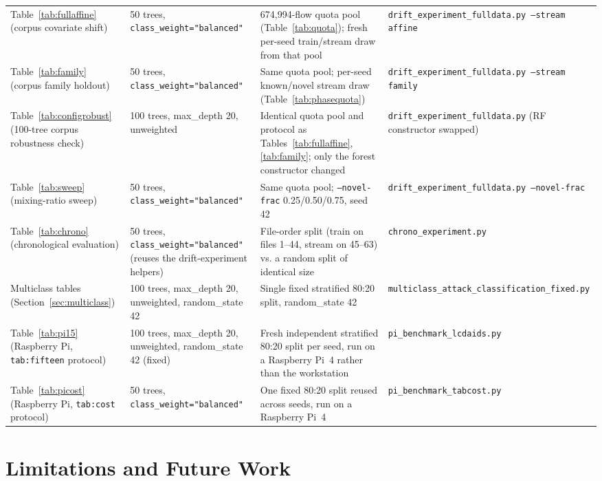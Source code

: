 \documentclass[11pt,a4paper]{article}
\begin{document}
\begin{longtable}{p{3.1cm} p{3.6cm} p{4.1cm} p{3.6cm}}
Table~\ref{tab:fullaffine} (corpus covariate shift) &
50 trees, \texttt{class\_weight="balanced"} &
674{,}994-flow quota pool (Table~\ref{tab:quota}); fresh per-seed
train/stream draw from that pool &
\texttt{drift\_experiment\_fulldata.py --stream affine} \\
Table~\ref{tab:family} (corpus family holdout) &
50 trees, \texttt{class\_weight="balanced"} &
Same quota pool; per-seed known/novel stream draw (Table~\ref{tab:phasequota}) &
\texttt{drift\_experiment\_fulldata.py --stream family} \\
Table~\ref{tab:configrobust} (100-tree corpus robustness check) &
100 trees, max\_depth 20, unweighted &
Identical quota pool and protocol as Tables~\ref{tab:fullaffine},
\ref{tab:family}; only the forest constructor changed &
\texttt{drift\_experiment\_fulldata.py} (RF constructor swapped) \\
Table~\ref{tab:sweep} (mixing-ratio sweep) &
50 trees, \texttt{class\_weight="balanced"} &
Same quota pool; \texttt{--novel-frac} 0.25/0.50/0.75, seed 42 &
\texttt{drift\_experiment\_fulldata.py --novel-frac} \\
Table~\ref{tab:chrono} (chronological evaluation) &
50 trees, \texttt{class\_weight="balanced"} (reuses the drift-experiment
helpers) &
File-order split (train on files 1--44, stream on 45--63) vs. a random
split of identical size &
\texttt{chrono\_experiment.py} \\
Multiclass tables (Section~\ref{sec:multiclass}) &
100 trees, max\_depth 20, unweighted, random\_state 42 &
Single fixed stratified 80:20 split, random\_state 42 &
\texttt{multiclass\_attack\_classification\_fixed.py} \\
Table~\ref{tab:pi15} (Raspberry Pi, \texttt{tab:fifteen} protocol) &
100 trees, max\_depth 20, unweighted, random\_state 42 (fixed) &
Fresh independent stratified 80:20 split per seed, run on a Raspberry
Pi~4 rather than the workstation &
\texttt{pi\_benchmark\_lcdaids.py} \\
Table~\ref{tab:picost} (Raspberry Pi, \texttt{tab:cost} protocol) &
50 trees, \texttt{class\_weight="balanced"} &
One fixed 80:20 split reused across seeds, run on a Raspberry Pi~4 &
\texttt{pi\_benchmark\_tabcost.py} \\
\end{longtable}

\FloatBarrier
\section{Limitations and Future Work}
\label{sec:limitations}
\end{document}
